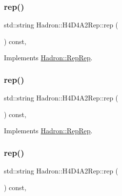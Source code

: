 \subsubsection{\texorpdfstring{rep()}{rep()}\hspace{0.1cm}{\footnotesize\ttfamily [2/5]}}
{\footnotesize\ttfamily std\+::string Hadron\+::\+H4\+D4\+A2\+Rep\+::rep (\begin{DoxyParamCaption}{ }\end{DoxyParamCaption}) const\hspace{0.3cm}{\ttfamily [inline]}, {\ttfamily [virtual]}}



Implements \mbox{\hyperlink{structHadron_1_1RepRep_ab3213025f6de249f7095892109575fde}{Hadron\+::\+Rep\+Rep}}.

\mbox{\label{structHadron_1_1H4D4A2Rep_a3964a2a2df9370ac3176d54fa588eb8a}} 
\subsubsection{\texorpdfstring{rep()}{rep()}\hspace{0.1cm}{\footnotesize\ttfamily [3/5]}}
{\footnotesize\ttfamily std\+::string Hadron\+::\+H4\+D4\+A2\+Rep\+::rep (\begin{DoxyParamCaption}{ }\end{DoxyParamCaption}) const\hspace{0.3cm}{\ttfamily [inline]}, {\ttfamily [virtual]}}



Implements \mbox{\hyperlink{structHadron_1_1RepRep_ab3213025f6de249f7095892109575fde}{Hadron\+::\+Rep\+Rep}}.

\mbox{\label{structHadron_1_1H4D4A2Rep_a3964a2a2df9370ac3176d54fa588eb8a}} 
\subsubsection{\texorpdfstring{rep()}{rep()}\hspace{0.1cm}{\footnotesize\ttfamily [4/5]}}
{\footnotesize\ttfamily std\+::string Hadron\+::\+H4\+D4\+A2\+Rep\+::rep (\begin{DoxyParamCaption}{ }\end{DoxyParamCaption}) const\hspace{0.3cm}{\ttfamily [inline]}, {\ttfamily [virtual]}}



